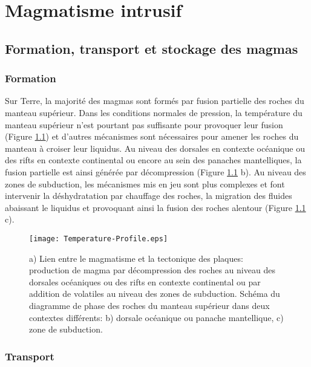 \chapter{Magmatisme intrusif}
\label{chap1}
\minitoc

\section{Formation, transport et stockage des magmas}
\label{C1-sec:magm-intr-un}

\subsection{Formation}
\label{C1-sec:formation-1}

Sur Terre, la majorité des magmas sont formés par fusion partielle des
roches du manteau supérieur. Dans les conditions normales de
pression, la température du manteau supérieur n'est pourtant pas
suffisante pour provoquer leur fusion (Figure \ref{C1-Geoterme}) et
d'autres mécanismes sont nécessaires pour amener les roches du manteau
à croiser leur liquidus. Au niveau des dorsales en contexte
océanique ou des rifts en contexte continental ou encore au sein des
panaches mantelliques, la fusion partielle est ainsi générée par
décompression (Figure \ref{C1-Geoterme} b). Au niveau des zones de
subduction, les mécanismes mis en jeu sont plus complexes et font
intervenir la déshydratation par chauffage des roches, la migration
des fluides abaissant le liquidus et provoquant ainsi la fusion des
roches alentour (Figure \ref{C1-Geoterme} c).
\begin{figure}[h!]
 \begin{center}
 \graphicspath{ {/Users/thorey/Documents/These/Manuscript/Figure/Chapter1/} }
 \texttt{[image: Temperature-Profile.eps]}
 \caption{a) Lien  entre le magmatisme  et la tectonique  des plaques:
   production  de magma  par décompression  des roches  au niveau  des
   dorsales océaniques  ou des  rifts en  contexte continental  ou par
   addition de volatiles au niveau  des zones de subduction. Schéma du
   diagramme  de  phase des  roches  du  manteau supérieur  dans  deux
   contextes différents: b) dorsale  océanique ou panache mantellique,
   c) zone de subduction.}
 \label{C1-Geoterme}
 \end{center}
\end{figure}

\subsection{Transport}
\label{C1-sec:transport}

